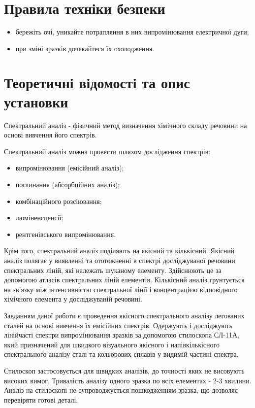 \documentclass[twocolumn]{el-author}
\begin{document}
\section{Правила техніки безпеки}

\begin{itemize}
	\item  бережіть очі, уникайте потрапляння в них випромінювання
електричної дуги;
	\item  при зміні зразків дочекайтеся їх охолодження.
\end{itemize}

\section{Теоретичні відомості та опис установки}

Спектральний аналіз - фізичний метод визначення хімічного складу
речовини на основі вивчення його спектрів.

Спектральний аналіз можна провести шляхом дослідження спектрів:

\begin{itemize}
	\item  випромінювання (емісійний аналіз);
	\item  поглинання (абсорбційних аналіз);
	\item  комбінаційного розсіювання;
	\item  люміненсценсії;
	\item  рентгенівського випромінювання.
\end{itemize}

Крім того, спектральний аналіз поділяють на якісний та кількісний. Якісний
аналіз полягає у виявленні та ототожненні в спектрі досліджуваної речовини
спектральних ліній, які належать шуканому елементу. Здійснюють це за
допомогою атласів спектральних ліній елементів. Кількісний аналіз
грунтується на зв'язку між інтенсивністю спектральної лінії і концентрацією
відповідного хімічного елемента у досліджуваній речовині.

Завданням даної роботи є проведення якісного спектрального аналізу
легованих сталей на основі вивчення їх емісійних спектрів. Одержують і
досліджують лінійчасті спектри випромінювання зразків за допомогою
стилоскопа СЛ-11А, який призначений для швидкого візуального якісного і
напівкількісного спектрального аналізу сталі та кольорових сплавів у
видимій частині спектра.

Стилоскоп застосовується для швидких аналізів, до точності яких не
висовують високих вимог. Тривалість аналізу одного зразка по всіх
елементах - 2-3 хвилини. Аналіз на стилоскопі не супроводжується
пошкодженням зразка, що дозволяє перевіряти готові деталі.
\end{document}
